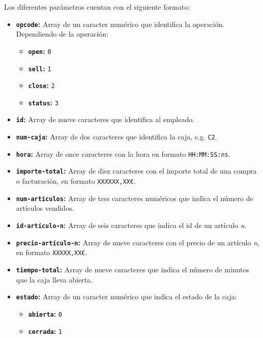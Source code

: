 Los diferentes parámetros cuentan con el siguiente formato:
\begin{itemize}
    \item \textbf{\texttt{opcode}:} Array de un caracter numérico que identifica la operación.\\
    Dependiendo de la operación:
    \begin{itemize}
        \item \textbf{\texttt{open}:} \texttt{0}
        \item \textbf{\texttt{sell}:} \texttt{1}
        \item \textbf{\texttt{close}:} \texttt{2}
        \item \textbf{\texttt{status}:} \texttt{3}
    \end{itemize}
    \item \textbf{\texttt{id}:} Array de nueve caracteres que identifica al empleado.
    \item \textbf{\texttt{num-caja}:} Array de dos caracteres que identifica la caja, e.g. \texttt{C2}.
    \item \textbf{\texttt{hora}:} Array de once caracteres con la hora en formato \texttt{HH:MM:SS:ns}.
    \item \textbf{\texttt{importe-total}:} Array de diez caracteres con el importe total de una compra o facturación, en formato \texttt{XXXXXX,XX€}.
    \item \textbf{\texttt{num-artículos}:} Array de tres caracteres numéricos que indica el número de artículos vendidos.
    \item \textbf{\texttt{id-artículo-n}:} Array de seis caracteres que indica el id de un artículo \textit{n}.
    \item \textbf{\texttt{precio-artículo-n}:} Array de nueve caracteres con el precio de un artículo \textit{n}, en formato \texttt{XXXXX,XX€}.
    \item \textbf{\texttt{tiempo-total}:} Array de nueve caracteres que indica el número de minutos que la caja lleva abierta.
    \item \textbf{\texttt{estado}:} Array de un caracter numérico que indica el estado de la caja:
    \begin{itemize}
        \item \textbf{\texttt{abierta}:} \texttt{0}
        \item \textbf{\texttt{cerrada}:} \texttt{1}
    \end{itemize}
\end{itemize}

